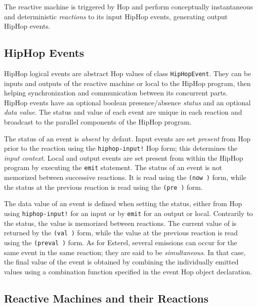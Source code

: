 \documentclass{llncs}
\begin{document}
The reactive machine is triggered by Hop and perform conceptually
instantaneous and deterministic {\em reactions} to its input HipHop events, generating output HipHop events.

\subsection{HipHop Events}
\label{HipHop events}

HipHop logical events are abstract Hop values of class {\texttt{HipHopEvent}}.
They can be inputs and outputs of the reactive
machine or local to the HipHop program, then helping
synchronization and communication between its concurrent parts.
HipHop events have an optional boolean presence/absence {\em{status}}
and an optional {\em data value}. The
status and value of each event are unique in each reaction and
broadcast to the parallel components of the HipHop program.

The status of an event is {\em{absent}} by defaut. Input events are
set {\em{present}} from Hop prior to the reaction using the
{\texttt{hiphop-input!}} Hop form; this determines the {\em{input
context}}. Local and output events are set present from within the
HipHop program by executing the {\texttt{emit{}}} statement.
The status of an event  is not memorized between successive reactions. It is read using the {\texttt{(now{} )}} form, while
the status at the previous reaction is read using the {\texttt{(pre{} )}}
form.

The data value of an event is defined when setting the status, either
from Hop using {\texttt{hiphop-input!}} for an input or by
{\texttt{emit{}}} for an output or local. Contrarily to the
status, the value is memorized between reactions. The current value of
 is returned by the {\texttt{(val{} )}} form, while the
value at the previous reaction is read using the
{\texttt{(preval{} )}} form. As for Esterel, several
emissions can occur for the same event in the same reaction; they are
said to be {\em{simultaneous}}.  In that case, the final value of the
event is obtained by combining the individually emitted values using a
combination function specified in the event Hop object declaration.

\subsection{Reactive Machines and their Reactions}
\label{Reactive Machines and their Reactions}
\end{document}
